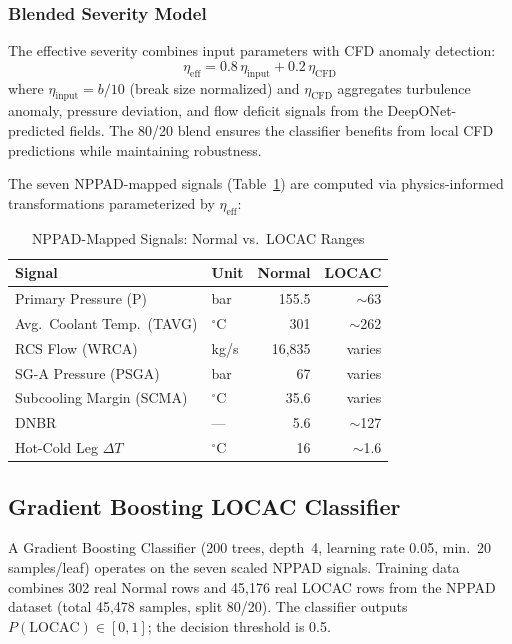 \documentclass[conference]{IEEEtran}
\begin{document}
\subsubsection{Blended Severity Model}
The effective severity combines input parameters with CFD anomaly detection:
\begin{equation}
\eta_\text{eff} = 0.8\,\eta_\text{input} + 0.2\,\eta_\text{CFD}
\label{eq:severity}
\end{equation}
where $\eta_\text{input} = b/10$ (break size normalized) and $\eta_\text{CFD}$ aggregates turbulence anomaly, pressure deviation, and flow deficit signals from the DeepONet-predicted fields. The 80/20 blend ensures the classifier benefits from local CFD predictions while maintaining robustness.

The seven NPPAD-mapped signals (Table~\ref{tab:nppad}) are computed via physics-informed transformations parameterized by $\eta_\text{eff}$:

\begin{table}[htbp]
\caption{NPPAD-Mapped Signals: Normal vs.\ LOCAC Ranges}
\label{tab:nppad}
\centering
\begin{tabular}{llrr}
\toprule
\textbf{Signal} & \textbf{Unit} & \textbf{Normal} & \textbf{LOCAC} \\
\midrule
Primary Pressure (P) & bar & 155.5 & $\sim$63 \\
Avg.\ Coolant Temp.\ (TAVG) & $^\circ$C & 301 & $\sim$262 \\
RCS Flow (WRCA) & kg/s & 16,835 & varies \\
SG-A Pressure (PSGA) & bar & 67 & varies \\
Subcooling Margin (SCMA) & $^\circ$C & 35.6 & varies \\
DNBR & --- & 5.6 & $\sim$127 \\
Hot-Cold Leg $\Delta T$ & $^\circ$C & 16 & $\sim$1.6 \\
\bottomrule
\end{tabular}
\end{table}

\subsection{Gradient Boosting LOCAC Classifier}

A Gradient Boosting Classifier (200 trees, depth~4, learning rate 0.05, min.\ 20 samples/leaf) operates on the seven scaled NPPAD signals. Training data combines 302 real Normal rows and 45,176 real LOCAC rows from the NPPAD dataset (total 45,478 samples, split 80/20). The classifier outputs $P(\text{LOCAC}) \in [0,1]$; the decision threshold is 0.5.
\end{document}
